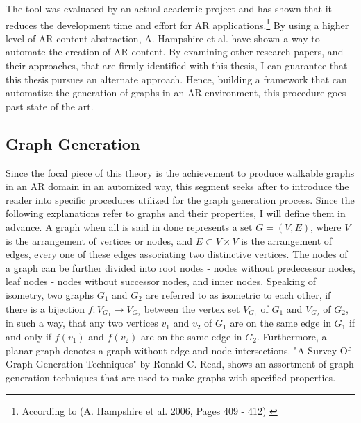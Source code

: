 \documentclass[12pt,a4paper,oneside,american,parskip=half]{article}
\begin{document}
\begin{justify}
\begin{normalsize}
The tool was evaluated by an actual academic project and has shown that it reduces the development time and effort for AR applications.\footnote{According to (A. Hampshire et al. 2006, Pages 409 - 412) \cite{frameworkAutomation}}
By using a higher level of AR-content abstraction, A. Hampshire et al. have shown a way to automate the creation of AR content.
\newline
\newline
By examining other research papers, and their approaches, that are firmly identified with this thesis, I can guarantee that this thesis pursues an alternate approach. Hence, building a framework that can automatize the generation of graphs in an AR environment, this procedure goes past state of the art.

\subsection{Graph Generation}
Since the focal piece of this theory is the achievement to produce walkable graphs in an AR domain in an automized way, this segment seeks after to introduce the reader into specific procedures utilized for the graph generation process.
\newline
Since the following explanations refer to graphs and their properties, I will define them in advance.
\newline
A graph when all is said in done represents a set $G = (V, E)$, where $V$ is the arrangement of vertices or nodes, and $E \subset V\times V$ is the arrangement of edges, every one of these edges associating two distinctive vertices. The nodes of a graph can be further divided into root nodes - nodes without predecessor nodes, leaf nodes - nodes without successor nodes, and inner nodes.
\newline
Speaking of isometry, two graphs $G_1$ and $G_2$ are referred to as isometric to each other, if there is a bijection $f: V_{G_1} \longrightarrow V_{G_2}$ between the vertex set $V_{G_1}$ of $G_1$ and $V_{G_2}$ of $G_2$, in such a way, that any two vertices $v_1$ and $v_2$ of $G_1$ are on the same edge in $G_1$ if and only if $f(v_1)$ and $f(v_2)$ are on the same edge in $G_2$.
\newline
Furthermore, a planar graph denotes a graph without edge and node intersections.
\newline
\newline
"A Survey Of Graph Generation Techniques" by Ronald C. Read, shows an assortment of graph generation techniques that are used to make graphs with specified properties.

\end{normalsize}
\end{justify}
\end{document}
